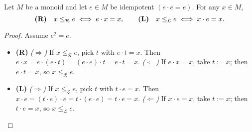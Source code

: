 \begin{lemma}
\label{lem:RLRel-idempotent_iff}
Let \(M\) be a monoid and let \(e\in M\) be idempotent \((e\cdot e = e)\). For any \(x\in M\),
\[
\text{\bf(R)}\quad x \le_{\mathcal R} e \;\Longleftrightarrow\; e\cdot x = x,
\qquad
\text{\bf(L)}\quad x \le_{\mathcal L} e \;\Longleftrightarrow\; x\cdot e = x.
\]
\leanok
{}
\end{lemma}
\begin{proof}
\leanok
Assume \(e^2=e\).
\begin{itemize}
  \item \textbf{(R)}  
    \emph{(\(\Rightarrow\))} If \(x \le_{\mathcal R} e\), pick \(t\) with \(e\cdot t = x\). Then
    \(e\cdot x = e\cdot(e\cdot t) = (e\cdot e)\cdot t = e\cdot t = x\).
    \emph{(\(\Leftarrow\))} If \(e\cdot x = x\), take \(t:=x\); then \(e\cdot t = x\), so \(x \le_{\mathcal R} e\).
  \item \textbf{(L)}  
    \emph{(\(\Rightarrow\))} If \(x \le_{\mathcal L} e\), pick \(t\) with \(t\cdot e = x\). Then
    \(x\cdot e = (t\cdot e)\cdot e = t\cdot(e\cdot e) = t\cdot e = x\).
    \emph{(\(\Leftarrow\))} If \(x\cdot e = x\), take \(t:=x\); then \(t\cdot e = x\), so \(x \le_{\mathcal L} e\).
\end{itemize}
\end{proof}


